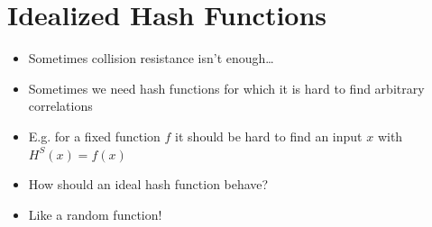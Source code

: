 \section{Idealized Hash Functions}
	\begin{itemize}
	    \item Sometimes collision resistance isn’t enough…
	    \item Sometimes we need hash functions for which it is hard to find arbitrary correlations
	    \item E.g. for a fixed function $f$ it should be hard to find an input $x$ with $H^S(x)=f(x)$
	    \item How should an ideal hash function behave?
	    \item Like a random function!
	\end{itemize}


